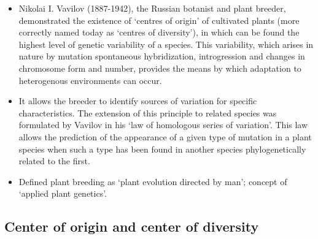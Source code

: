 \documentclass[
  ignorenonframetext,
  aspectratio=169]{beamer}
\providecommand{\tightlist}{%
  \setlength{\itemsep}{0pt}\setlength{\parskip}{0pt}}
\begin{document}
\begin{frame}{}
\protect\hypertarget{section-10}{}
\begin{itemize}
\tightlist
\item
  Nikolai I. Vavilov (1887-1942), the Russian botanist and plant
  breeder, demonstrated the existence of `centres of origin' of
  cultivated plants (more correctly named today as `centres of
  diversity'), in which can be found the highest level of genetic
  variability of a species. This variability, which arises in nature by
  mutation spontaneous hybridization, introgression and changes in
  chromosome form and number, provides the means by which adaptation to
  heterogenous environments can occur.
\item
  It allows the breeder to identify sources of variation for specific
  characteristics. The extension of this principle to related species
  was formulated by Vavilov in his `law of homologous series of
  variation'. This law allows the prediction of the appearance of a
  given type of mutation in a plant species when such a type has been
  found in another species phylogenetically related to the first.
\item
  Defined plant breeding as `plant evolution directed by man'; concept
  of `applied plant genetics'.
\end{itemize}
\end{frame}

\hypertarget{center-of-origin-and-center-of-diversity}{%
\subsection{Center of origin and center of
diversity}\label{center-of-origin-and-center-of-diversity}}

\begin{frame}{}
\protect\hypertarget{section-11}{}
\end{frame}
\end{document}
